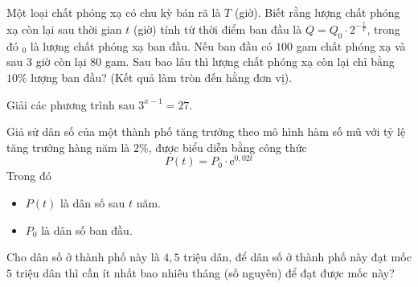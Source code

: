 \begin{bt}%

	Một loại chất phóng xạ có chu kỳ bán rã là $T$ (giờ). Biết rằng lượng chất phóng xạ còn lại sau thời gian $t$ (giờ) tính từ thời điểm ban đầu là $Q=Q_0\cdot 2^{-\tfrac{t}{T}}$, trong đó $_0$ là lượng chất phóng xạ ban đầu. Nếu ban đầu có $100$ gam chất phóng xạ và sau $3$ giờ còn lại $80$ gam. Sau bao lâu thì lượng chất phóng xạ còn lại chỉ bằng $10\%$ lượng ban đầu? (Kết quả làm tròn đến hằng đơn vị).
\end{bt}

\begin{bt}%

	Giải các phương trình sau $3^{x-1}=27$.
\end{bt}

\begin{bt}%

	Giả sử dân số của một thành phố tăng trưởng theo mô hình hàm số mũ với tỷ lệ tăng trưởng hàng năm là $2\%$, được biểu diễn bằng công thức
	$$P(t)=P_0\cdot \mathrm{e}^{0{,}02t}$$
	Trong đó
	\begin{itemize}
		\item $P(t)$ là dân số sau $t$ năm.
		\item $P_0$ là dân số ban đầu.
	\end{itemize}
	Cho dân số ở thành phố này là $4{,}5$ triệu dân, để dân số ở thành phố này đạt mốc $5$ triệu dân thì cần ít nhất bao nhiêu tháng (số nguyên) để đạt được mốc này?
\end{bt}


